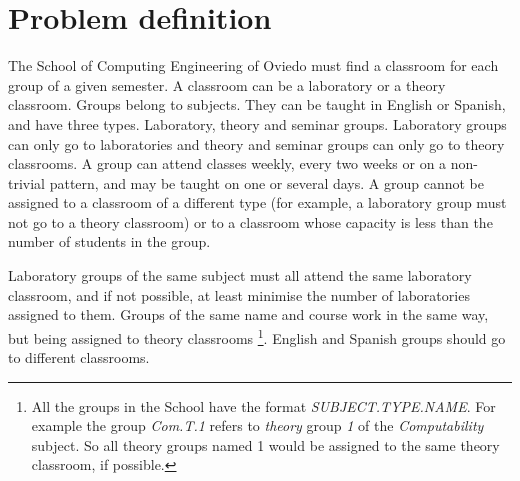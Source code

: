 \renewcommand{\documentname}{Problem definition}

\chapter{Problem definition}

The School of Computing Engineering of Oviedo must find a classroom for each group of a given semester. A classroom can be a laboratory or a theory classroom. Groups belong to subjects. They can be taught in English or Spanish, and have three types. Laboratory, theory and seminar groups. Laboratory groups can only go to laboratories and theory and seminar groups can only go to theory classrooms. A group can attend classes weekly, every two weeks or on a non-trivial pattern, and may be taught on one or several days. A group cannot be assigned to a classroom of a different type (for example, a laboratory group must not go to a theory classroom) or to a classroom whose capacity is less than the number of students in the group.

Laboratory groups of the same subject must all attend the same laboratory classroom, and if not possible, at least minimise the number of laboratories assigned to them. Groups of the same name and course work in the same way, but being assigned to theory classrooms \footnote{All the groups in the School have the format \textit{SUBJECT.TYPE.NAME}. For example the group \textit{Com.T.1} refers to \textit{theory} group \textit{1} of the \textit{Computability} subject. So all theory groups named 1 would be assigned to the same theory classroom, if possible.}. English and Spanish groups should go to different classrooms.

